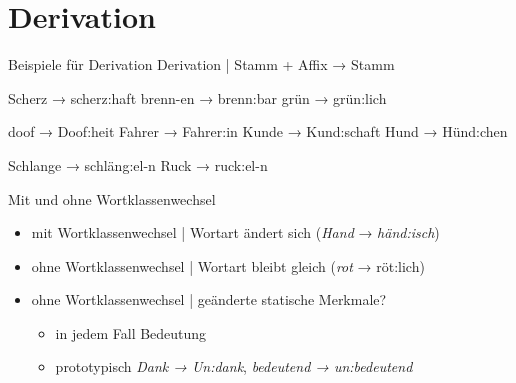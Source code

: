 \section{Derivation}

\begin{frame}
  {Beispiele für Derivation}
  \pause
  Derivation | \alert{Stamm + Affix → Stamm}
  \Halbzeile
  \pause
  \begin{exe}
    \ex
    \begin{xlist}
      \ex Scherz → scherz\alert{:haft}
      \pause
      \ex brenn-en → brenn\alert{:bar}
      \pause
      \ex grün → grün\alert{:lich}
    \end{xlist}
    \pause
    \Halbzeile
    \ex
    \begin{xlist}
      \ex doof → Doof\alert{:heit}
      \pause
      \ex Fahrer → Fahrer\alert{:in}
      \pause
      \ex Kunde → Kund\alert{:schaft}
      \pause
      \ex Hund → Hünd\alert{:chen}
    \end{xlist}
    \pause
    \Halbzeile
    \ex
    \begin{xlist}
      \ex Schlange → schläng\alert{:el}-n
      \pause
      \ex Ruck → ruck\alert{:el}-n
    \end{xlist}
  \end{exe}
\end{frame}

\begin{frame}
  {Mit und ohne Wortklassenwechsel}
  \pause
  \begin{itemize}[<+->]
    \item \alert{mit} Wortklassenwechsel | Wortart ändert sich (\textit{Hand} → \textit{händ:isch})
    \item \alert{ohne} Wortklassenwechsel | Wortart bleibt gleich (\textit{rot} → röt:lich)
      \Zeile
    \item ohne Wortklassenwechsel | geänderte statische Merkmale?
      \begin{itemize}[<+->]
        \item in jedem Fall \alert{Bedeutung}
        \item prototypisch \textit{Dank → Un:dank}, \textit{bedeutend → un:bedeutend}
      \end{itemize}
  \end{itemize}
\end{frame}

